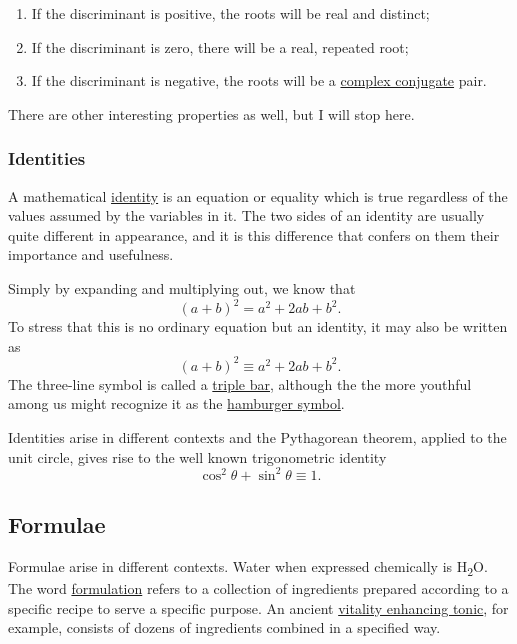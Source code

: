 \documentclass[
  a4paper,
]{article}
\begin{document}
\begin{enumerate}
\def\labelenumi{\alph{enumi}.}
\item
  If the discriminant is positive, the roots will be real and distinct;
\item
  If the discriminant is zero, there will be a real, repeated root;
\item
  If the discriminant is negative, the roots will be a
  \href{https://www.mathcentre.ac.uk/resources/sigma\%20complex\%20number\%20leaflets/sigma-complex6-2009-1.pdf}{complex
  conjugate} pair.
\end{enumerate}

There are other interesting properties as well, but I will stop here.

\subsubsection{Identities}\label{identities}

A mathematical
\href{https://en.wikipedia.org/wiki/Identity_(mathematics)}{identity} is
an equation or equality which is true regardless of the values assumed
by the variables in it. The two sides of an identity are usually quite
different in appearance, and it is this difference that confers on them
their importance and usefulness.

Simply by expanding and multiplying out, we know that \[
(a+b)^2 = a^2 +2ab + b^2. 
\] To stress that this is no ordinary equation but an identity, it may
also be written as \[
(a+b)^2 \equiv a^2 +2ab + b^2.
\] The three-line symbol is called a
\href{https://en.wikipedia.org/wiki/Triple_bar}{triple bar}, although
the the more youthful among us might recognize it as the
\href{https://en.wikipedia.org/wiki/Hamburger_button}{hamburger symbol}.

Identities arise in different contexts and the Pythagorean theorem,
applied to the unit circle, gives rise to the well known trigonometric
identity \[
\cos^2\theta + \sin^2\theta \equiv 1.
\]

\subsection{Formulae}\label{formulae}

Formulae arise in different contexts. Water when expressed chemically is
H\textsubscript{\(2\)}O. The word
\href{https://www.vocabulary.com/dictionary/formulation}{formulation}
refers to a collection of ingredients prepared according to a specific
recipe to serve a specific purpose. An ancient
\href{https://pmc.ncbi.nlm.nih.gov/articles/PMC6571565/\#:~:text=Chyawanprash\%20is\%20formulated\%20by\%20processing,richest\%20source\%20of\%20vitamin\%20C}{vitality
enhancing tonic}, for example, consists of dozens of ingredients
combined in a specified way.
\end{document}
